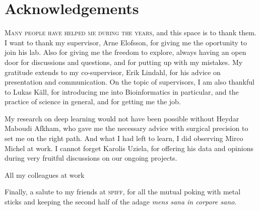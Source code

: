 \chapter*{Acknowledgements}

\lettrine[lines=3, lhang=0.15, nindent=0em]{\color{Maroon}M}{any people have helped me during the years,}
and this space is to thank them.
I want to thank my supervisor, Arne Elofsson, for giving me the oportunity to join his lab.
Also for giving me the freedom to explore, always having an open door for discussions and questions, and for putting up with my mistakes.
My gratitude extends to my co-supervisor, Erik Lindahl, for his advice on presentation and communication.
On the topic of supervisors, I am also thankful to Lukas Käll, for introducing me into Bioinformatics in particular, and the practice of science in general, and for getting me the job.


My research on deep learning would not have been possible without Heydar Maboudi Afkham, who gave me the necessary advice with surgical precision to set me on the right path.
And what I had left to learn, I did observing Mirco Michel at work.
I cannot forget Karolis Uziela, for offering his data and opinions during very fruitful discussions on our ongoing projects.

All my colleagues at work



Finally, a salute to my friends at \textsc{spiff}, for all the mutual poking with metal sticks and keeping the second half of the adage \emph{mens sana in corpore sano}.
